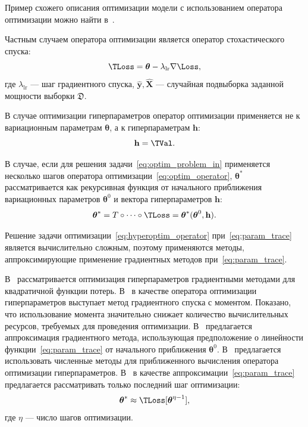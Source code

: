 Пример схожего описания оптимизации модели с использованием оператора оптимизации можно найти в~\cite{early}.

Частным случаем оператора оптимизации является оператор стохастического спуска:
\begin{equation}
\label{eq:sgd_operator}
    \TLoss  = \boldsymbol{\theta} - \lambda_{\text{lr}} \nabla \Loss,
\end{equation}
где $\lambda_{\text{lr}}$ --- шаг градиентного спуска, $\hat{\mathbf{y}}, \hat{\mathbf{X}}$ --- случайная подвыборка заданной мощности выборки $\mathfrak{D}$.

В случае оптимизации гиперпараметров оператор оптимизации применяется не к вариационным параметрам $\boldsymbol{\theta}$, а к гиперпараметрам $\mathbf{h}$:
\begin{equation}
\label{eq:hyperoptim_operator}
    \h = \TVal.
\end{equation}

В случае, если для решения задачи~\eqref{eq:optim_problem_in} применяется несколько шагов оператора оптимизации~\eqref{eq:optim_operator},
$\boldsymbol{\theta}^{*}$ рассматривается как рекурсивная функция от начального приближения вариационных параметров $\boldsymbol{\theta}^{0}$ и вектора гиперпараметров $\mathbf{h}$:
\begin{equation}
\label{eq:param_trace}
    \boldsymbol{\theta}^{*} = T \circ \dots \circ \TLoss = \boldsymbol{\theta}^{*}(\boldsymbol{\theta}^{0}, \mathbf{h}).
\end{equation}

Решение задачи оптимизации~\eqref{eq:hyperoptim_operator} при~\eqref{eq:param_trace} является вычислительно сложным, поэтому применяются методы, аппроксимирующие применение градиентных методов при~\eqref{eq:param_trace}.

В~\cite{hyper_bengio} рассматривается оптимизация гиперпараметров градиентными методами для квадратичной функции потерь. В~\cite{hyper} в качестве оператора оптимизации гиперпараметров выступает метод градиентного спуска с моментом. Показано, что использование момента значительно снижает количество вычислительных ресурсов, требуемых для проведения оптимизации. В~\cite{hyper_mad} предлагается аппроксимация градиентного метода, использующая предположение о линейности функции~\eqref{eq:param_trace} от начального приближения $\boldsymbol{\theta}^0$. В~\cite{hyper_hoag} предлагается использовать численные методы для приближенного вычисления оператора оптимизации гиперпараметров. В~\cite{greed_hyper} в качестве аппроксимации~\eqref{eq:param_trace} предлагается рассматривать только последний шаг оптимизации:
\[
    \boldsymbol{\theta}^{*} \approx \TLoss[\teta^{\eta-1}],
\]
где $\eta$ --- число шагов оптимизации.


